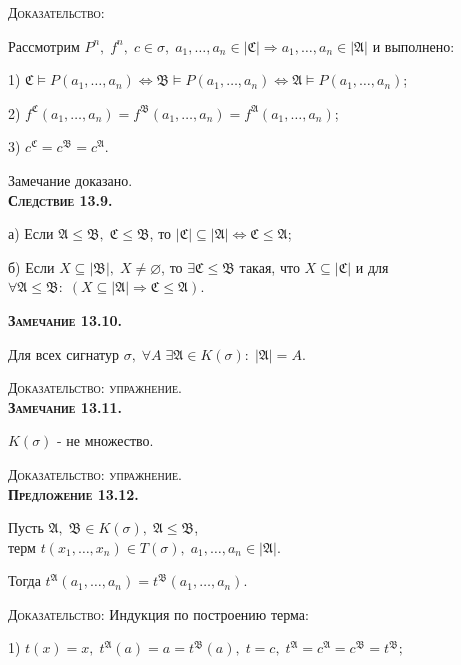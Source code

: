 \documentclass[18pt, a4paper]{extarticle}
\begin{document}
\textsc{Доказательство: }

Рассмотрим $P^n,\;f^n,\;c\in\sigma,\;a_1,\dots,a_n\in|\mathfrak{C}|\Rightarrow a_1,\dots,a_n\in|\mathfrak{A}|$ и выполнено:

1) $\mathfrak{C}\vDash P(a_1,\dots,a_n)\Leftrightarrow\mathfrak{B}\vDash P(a_1,\dots,a_n)\Leftrightarrow\mathfrak{A}\vDash P(a_1,\dots,a_n)$;

2) $f^{\mathfrak{C}}(a_1,\dots,a_n)=f^{\mathfrak{B}}(a_1,\dots,a_n)=f^{\mathfrak{A}}(a_1,\dots,a_n)$;

3) $c^{\mathfrak{C}}=c^{\mathfrak{B}}=c^{\mathfrak{A}}$.

Замечание доказано.\\

\textbf{\textsc{Следствие 13.9.}} 

а) Если $\mathfrak{A}\leqslant\mathfrak{B},\;\mathfrak{C}\leqslant\mathfrak{B}$, то $|\mathfrak{C}|\subseteq|\mathfrak{A}|\Leftrightarrow\mathfrak{C}\leqslant\mathfrak{A}$;

б) Если $X\subseteq|\mathfrak{B}|,\;X\neq\varnothing$, то $\exists\mathfrak{C}\leqslant\mathfrak{B}$ такая, что $
X\subseteq|\mathfrak{C}|$ и для\\ $\forall\mathfrak{A}\leqslant\mathfrak{B}:\;(X\subseteq|\mathfrak{A}|\Rightarrow\mathfrak{C}\leqslant\mathfrak{A})$.

\textbf{\textsc{Замечание 13.10.}} 

Для всех сигнатур $\sigma,\;\forall A\;\exists\mathfrak{A}\in K(\sigma):\;|\mathfrak{A}|=A$.

\textsc{Доказательство: упражнение.}\\

\textbf{\textsc{Замечание 13.11.}} 

$K(\sigma)$ -  не множество.

\textsc{Доказательство: упражнение.}\\

\textbf{\textsc{Предложение 13.12.}} 

Пусть $\mathfrak{A},\;\mathfrak{B}\in K(\sigma),\;\mathfrak{A}\leqslant\mathfrak{B}$, \\ терм $t(x_1,\dots,x_n)\in T(\sigma),\;a_1,\dots,a_n\in|\mathfrak{A}|$.

Тогда $t^{\mathfrak{A}}(a_1,\dots,a_n)=t^{\mathfrak{B}}(a_1,\dots,a_n)$.

\textsc{Доказательство:} Индукция по построению терма: 

1) $t(x)=x,\;t^{\mathfrak{A}}(a)=a=t^{\mathfrak{B}}(a),\; t=c,\;t^{\mathfrak{A}}=c^{\mathfrak{A}}=c^{\mathfrak{B}}=t^{\mathfrak{B}};$
\end{document}
